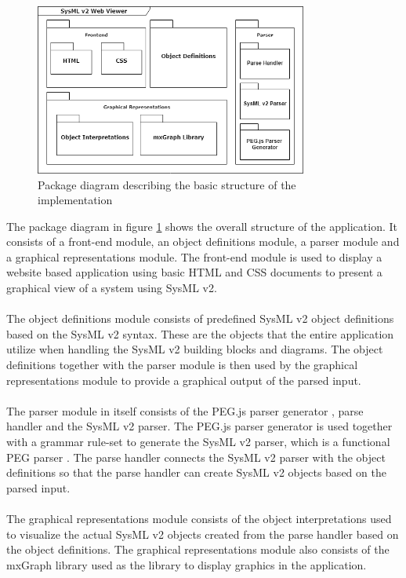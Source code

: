 \documentclass{article}
\begin{document}
\begin{figure}[H]
    \begin{center}
        \includegraphics[width=0.8\textwidth]{Module_diag-SysML_project.png}
        \caption{Package diagram describing the basic structure of the implementation}
        \label{package}
    \end{center}
\end{figure}
The package diagram in figure \ref{package} shows the overall structure of the application. It consists of a front-end module, an object definitions module, a parser module and a graphical representations module. The front-end module is used to display a website based application using basic HTML \cite{HTML} and CSS \cite{CSS} documents to present a graphical view of a system using SysML v2. 
\\\\
The object definitions module consists of predefined SysML v2 object definitions based on the SysML v2 syntax. These are the objects that the entire application utilize when handling the SysML v2 building blocks and diagrams. The object definitions together with the parser module is then used by the graphical representations module to provide a graphical output of the parsed input.
\\\\
The parser module in itself consists of the PEG.js parser generator \cite{PEG-JS}, parse handler and the SysML v2 parser. The PEG.js parser generator is used together with a grammar rule-set to generate the SysML v2 parser, which is a functional PEG parser \cite{wiki:PEG}. The parse handler connects the SysML v2 parser with the object definitions so that the parse handler can create SysML v2 objects based on the parsed input. 
\\\\
The graphical representations module consists of the object interpretations used to visualize the actual SysML v2 objects created from the parse handler based on the object definitions. The graphical representations module also consists of the mxGraph library \cite{mxGraph} used as the library to display graphics in the application. 
\end{document}
